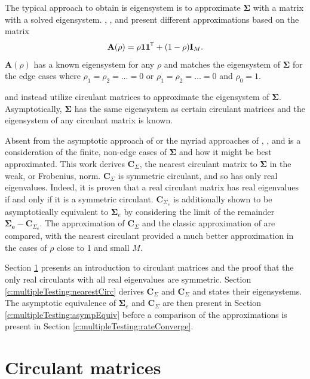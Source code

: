 \documentclass[letterpaper,12pt,oneside,final]{article}
\newcommand{\ve}[1]{\mathbf{#1}}           %
\newcommand{\m}[1]{\mathbf{#1}}               %
\newcommand{\sm}[1]{\boldsymbol{#1}}   %
\newcommand{\tr}[1]{{#1}^{\mkern-1.5mu\mathsf{T}}}              %
\begin{document}
The typical approach to obtain is eigensystem is to approximate $\sm{\Sigma}$ with a matrix with a solved eigensystem. \cite{cheverud2001}, \cite{LiJi2005}, and \cite{Galwey2009} present different approximations based on the matrix
\begin{equation} \label{eq:multipleTesting:commonCor}
  \m{A}(\rho) = \rho \ve{1} \tr{\ve{1}} + (1 - \rho) \m{I}_M.
\end{equation}
$\m{A}(\rho)$ has a known eigensystem for any $\rho$ and matches the eigensystem of $\sm{\Sigma}$ for the edge cases where $\rho_1 = \rho_2 = \dots = 0$ or $\rho_1 = \rho_2 = \dots = 0$ and $\rho_0 = 1$.

\cite{gray2006toeplitz} and \cite{grenanderszego1958} instead utilize circulant matrices to approximate the eigensystem of $\sm{\Sigma}$. Asymptotically, $\sm{\Sigma}$ has the same eigensystem as certain circulant matrices and the eigensystem of any circulant matrix is known.

Absent from the asymptotic approach of \cite{gray2006toeplitz} or the myriad approaches of \cite{cheverud2001}, \cite{LiJi2005}, and \cite{Galwey2009} is a consideration of the finite, non-edge cases of $\sm{\Sigma}$ and how it might be best approximated. This work derives $\m{C}_{\Sigma}$, the nearest circulant matrix to $\sm{\Sigma}$ in the weak, or Frobenius, norm. $\m{C}_{\Sigma}$ is symmetric circulant, and so has only real eigenvalues. Indeed, it is proven that a real circulant matrix has real eigenvalues if and only if it is a symmetric circulant. $\m{C}_{\Sigma_e}$ is additionally shown to be asymptotically equivalent to $\sm{\Sigma}_e$ by considering the limit of the remainder $\sm{\Sigma_e} - \m{C}_{\Sigma_e}$. The approximation of $\sm{C}_{\Sigma}$ and the classic approximation of \cite{gray2006toeplitz} are compared, with the nearest circulant provided a much better approximation in the cases of $\rho$ close to 1 and small $M$.

Section \ref{c:multipleTesting:circDecom} presents an introduction to circulant matrices and the proof that the only real circulants with all real eigenvalues are symmetric. Section \ref{c:multipleTesting:nearestCirc} derives $\m{C}_{\Sigma}$ and $\m{C}_{\Sigma}$ and states their eigensystems. The asymptotic equivalence of $\sm{\Sigma}_e$ and $\m{C}_{\Sigma}$ are then present in Section \ref{c:multipleTesting:asympEquiv} before a comparison of the approximations is present in Section \ref{c:multipleTesting:rateConverge}.

\section{Circulant matrices} \label{c:multipleTesting:circDecom}
\end{document}
